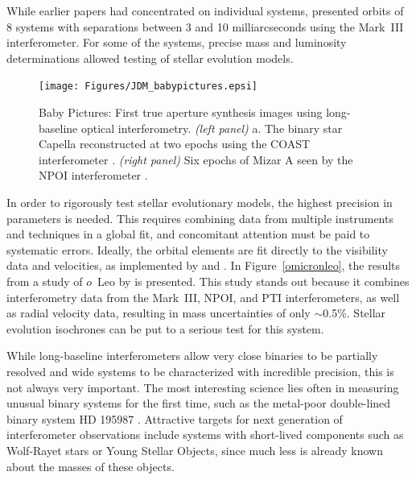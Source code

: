 \documentclass[12pt]{iopart}
\begin{document}
While earlier papers had concentrated on individual systems,
\citet{hummel1995} presented orbits of 8 systems with separations
between 3 and 10 milliarcseconds using the Mark~III interferometer.
For some of the systems, precise mass and luminosity determinations
allowed testing of stellar evolution models.  

\begin{figure}[tbhp]
\begin{center}
\texttt{[image: Figures/JDM\_babypictures.epsi]}
\caption{\footnotesize Baby Pictures: First true aperture synthesis images using 
long-baseline optical interferometry.
{\em (left panel)} a. 
The binary star Capella reconstructed at two epochs using
the COAST interferometer \citep[see Figure~2 of][reproduced with permission of
ESO]{baldwin1996}.
{\em (right panel)} Six epochs of Mizar A seen by the NPOI interferometer
\citep[see Figure~4 of ][reproduced with permission of the AAS]{benson1997}.
\label{babypictures}}
\end{center}
\end{figure}

In order to rigorously test stellar evolutionary models, the highest
precision in parameters is needed. This requires combining data from
multiple instruments and techniques in a global fit, and concomitant
attention must be paid to systematic errors.  Ideally, the orbital elements
are fit directly to the visibility data and velocities, as implemented
by \citet{hummel1998} and \citet{boden1999}.  In
Figure~\ref{omicronleo}, the results from a study of $o$~Leo by
\citet{hummel2001} is presented.  This study stands out because it
combines interferometry data from the Mark~III, NPOI, and PTI
interferometers, as well as radial velocity data, resulting in mass
uncertainties of only $\sim$0.5\%.  Stellar evolution isochrones can
be put to a serious test for this system.


While long-baseline interferometers allow very close binaries to be
partially resolved \citep[closest is probably 0.002'' binary
TZ~Tri;][]{koresko1998} and wide systems to be characterized with
incredible precision, this is not always very important.  The most
interesting science lies often in measuring unusual binary systems for
the first time, such as the metal-poor double-lined binary system HD
195987 \citep{torres2002}.  Attractive targets for next generation of
interferometer observations include systems with short-lived
components such as Wolf-Rayet stars or Young Stellar Objects, since
much less is already known about the masses of these objects.
\end{document}
